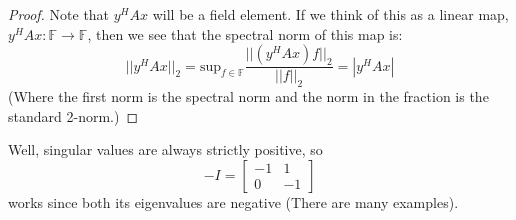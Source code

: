 \documentclass[12pt]{article}
\newenvironment{problem}[2][Problem]{\begin{trivlist}
\item[\hskip \labelsep {\bfseries #1}\hskip \labelsep {\bfseries #2.}]}{\end{trivlist}}
\theoremstyle{definition}
\theoremstyle{definition}
\theoremstyle{definition}
\theoremstyle{definition}
\begin{document}
\begin{problem}{4.33}
\begin{proof}
Note that $y^HAx$ will be a field element. If we think of this as a linear map, $y^HAx: \mathbb{F} \to \mathbb{F}$, then we see that the spectral norm of this map is:
$$||y^HAx||_2 = \text{sup}_{f \in \mathbb{F}} \frac{||(y^HAx)f||_2}{||f||_2} = |y^HAx| $$ (Where the first norm is the spectral norm and the norm in the fraction is the standard 2-norm.) 
\end{proof}
\end{problem}

\begin{problem}{4.36}
Well, singular values are always strictly positive, so 
$$
-I = \begin{bmatrix}
-1 & 1 \\
0 & -1
\end{bmatrix}
$$
works since both its eigenvalues are negative (There are many examples).
\end{problem}
\end{document}
